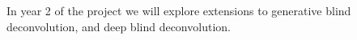 \documentclass[12pt]{article}
\begin{document}
In year 2 of the project we will explore extensions to generative blind deconvolution,
and deep blind deconvolution.





% 
% 
\end{document}
